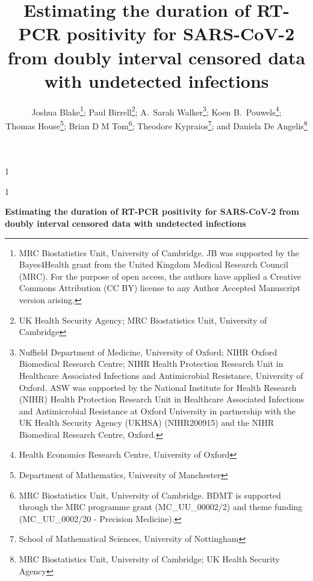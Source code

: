 \documentclass[12pt]{article}
\newcommand{\blind}{1}
\newcommand{\fulltitle}{Estimating the duration of RT-PCR positivity for SARS-CoV-2 from doubly interval censored data with undetected infections}
\begin{document}
%

\def\spacingset#1{\renewcommand{\baselinestretch}%
{#1}\small\normalsize} \spacingset{1}



\blind
{
  \title{\bf \fulltitle}
  \author{%
    Joshua Blake\thanks{MRC Biostatistics Unit, University of Cambridge. JB was supported by the Bayes4Health grant from the United Kingdom Medical Research Council (MRC). For the purpose of open access, the authors have applied a Creative Commons Attribution (CC BY) license to any Author Accepted Manuscript version arising.};
    Paul Birrell\thanks{UK Health Security Agency; MRC Biostatistics Unit, University of Cambridge};
    A.\ Sarah Walker\thanks{Nuffield Department of Medicine, University of Oxford; NIHR Oxford Biomedical Research Centre; NIHR Health Protection Research Unit in Healthcare Associated Infections and Antimicrobial Resistance, University of Oxford. ASW was supported by the National Institute for Health Research (NIHR) Health Protection Research Unit in Healthcare Associated Infections and Antimicrobial Resistance at Oxford University in partnership with the UK Health Security Agency (UKHSA) (NIHR200915) and the NIHR Biomedical Research Centre, Oxford.};
     Koen B.\ Pouwels\thanks{Health Economics Research Centre, University of 
Oxford}; \\
     Thomas House\thanks{Department of Mathematics, University of 
Manchester};
     Brian D M Tom\thanks{MRC Biostatistics Unit, University of Cambridge. BDMT is supported through the MRC programme grant (MC\_UU\_00002/2) and theme funding (MC\_UU\_0002/20 - Precision Medicine).};
     Theodore Kypraios\thanks{School of Mathematical Sciences, University of Nottingham};
     and Daniela De Angelis\thanks{MRC Biostatistics Unit, University of Cambridge; UK Health Security Agency}
  }
  \maketitle
} \fi

\blind
{
  \bigskip
  \bigskip
  \bigskip
  \begin{center}
    {\LARGE\bf \fulltitle}
  \end{center}
  \medskip
} \fi
\bigskip
\end{document}
